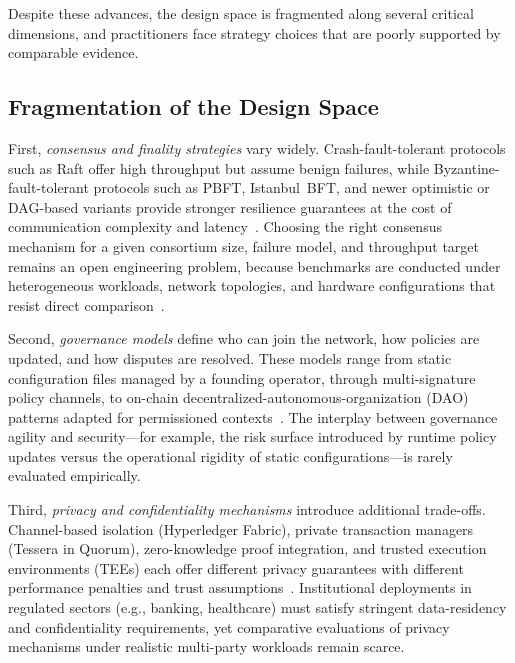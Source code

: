 \documentclass[journal]{IEEEtran}
\begin{document}
Despite these advances, the design space is fragmented along several critical dimensions, and practitioners face strategy choices that are poorly supported by comparable evidence.

\subsection{Fragmentation of the Design Space}

First, \emph{consensus and finality strategies} vary widely.
Crash-fault-tolerant protocols such as Raft offer high throughput but assume benign failures, while Byzantine-fault-tolerant protocols such as PBFT, Istanbul~BFT, and newer optimistic or DAG-based variants provide stronger resilience guarantees at the cost of communication complexity and latency~\cite{castro1999practical,sousa2018byzantine,baudet2019state}.
Choosing the right consensus mechanism for a given consortium size, failure model, and throughput target remains an open engineering problem, because benchmarks are conducted under heterogeneous workloads, network topologies, and hardware configurations that resist direct comparison~\cite{dinh2017blockbench,nasir2022performance}.

Second, \emph{governance models} define who can join the network, how policies are updated, and how disputes are resolved.
These models range from static configuration files managed by a founding operator, through multi-signature policy channels, to on-chain decentralized-autonomous-organization (DAO) patterns adapted for permissioned contexts~\cite{beck2018governance,reijers2021governance}.
The interplay between governance agility and security---for example, the risk surface introduced by runtime policy updates versus the operational rigidity of static configurations---is rarely evaluated empirically.

Third, \emph{privacy and confidentiality mechanisms} introduce additional trade-offs.
Channel-based isolation (Hyperledger Fabric), private transaction managers (Tessera in Quorum), zero-knowledge proof integration, and trusted execution environments (TEEs) each offer different privacy guarantees with different performance penalties and trust assumptions~\cite{androulaki2018hyperledger,benhamouda2020can}.
Institutional deployments in regulated sectors (e.g., banking, healthcare) must satisfy stringent data-residency and confidentiality requirements, yet comparative evaluations of privacy mechanisms under realistic multi-party workloads remain scarce.
\end{document}
